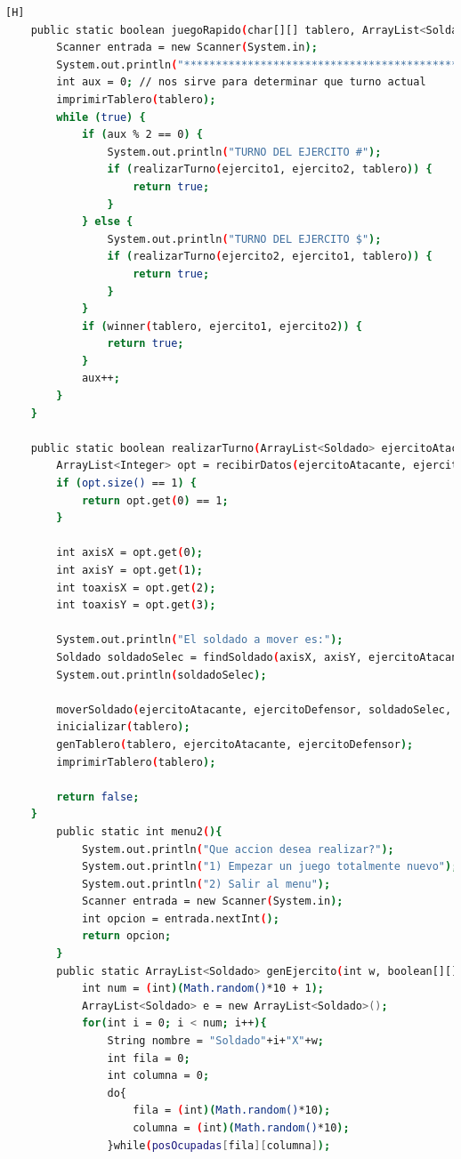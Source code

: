 \documentclass{article}
\begin{document}
\begin{lstlisting}[language=bash,caption={Creando la clase principal de VideoJuego_v1_lab12.java}][H]
	public static boolean juegoRapido(char[][] tablero, ArrayList<Soldado> ejercito1, ArrayList<Soldado> ejercito2) {
	    Scanner entrada = new Scanner(System.in);
	    System.out.println("******************************************************************");
	    int aux = 0; // nos sirve para determinar que turno actual
	    imprimirTablero(tablero);
	    while (true) {
	        if (aux % 2 == 0) {
	            System.out.println("TURNO DEL EJERCITO #");
	            if (realizarTurno(ejercito1, ejercito2, tablero)) {
	                return true;
	            }
	        } else {
	            System.out.println("TURNO DEL EJERCITO $");
	            if (realizarTurno(ejercito2, ejercito1, tablero)) {
	                return true;
	            }
	        }
	        if (winner(tablero, ejercito1, ejercito2)) {
	            return true;
	        }
	        aux++;
	    }
	}

	public static boolean realizarTurno(ArrayList<Soldado> ejercitoAtacante, ArrayList<Soldado> ejercitoDefensor, char[][] tablero) {
	    ArrayList<Integer> opt = recibirDatos(ejercitoAtacante, ejercitoDefensor);
	    if (opt.size() == 1) {
	        return opt.get(0) == 1;
	    }

	    int axisX = opt.get(0);
	    int axisY = opt.get(1);
	    int toaxisX = opt.get(2);
	    int toaxisY = opt.get(3);

	    System.out.println("El soldado a mover es:");
	    Soldado soldadoSelec = findSoldado(axisX, axisY, ejercitoAtacante);
	    System.out.println(soldadoSelec);
	    
	    moverSoldado(ejercitoAtacante, ejercitoDefensor, soldadoSelec, toaxisX, toaxisY);
	    inicializar(tablero);
	    genTablero(tablero, ejercitoAtacante, ejercitoDefensor);
	    imprimirTablero(tablero);

	    return false;
	}
		public static int menu2(){
			System.out.println("Que accion desea realizar?");
			System.out.println("1) Empezar un juego totalmente nuevo");
			System.out.println("2) Salir al menu");
			Scanner entrada = new Scanner(System.in);
			int opcion = entrada.nextInt();
			return opcion;
		}
		public static ArrayList<Soldado> genEjercito(int w, boolean[][] posOcupadas){
			int num = (int)(Math.random()*10 + 1);
			ArrayList<Soldado> e = new ArrayList<Soldado>();
			for(int i = 0; i < num; i++){
				String nombre = "Soldado"+i+"X"+w;
				int fila = 0;
				int columna = 0;
				do{
					fila = (int)(Math.random()*10);
					columna = (int)(Math.random()*10);
				}while(posOcupadas[fila][columna]);


\end{lstlisting}
\end{document}
